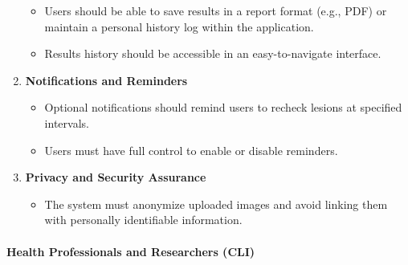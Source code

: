 \documentclass[
  12pt,
  oneside]{article}
\providecommand{\tightlist}{%
  \setlength{\itemsep}{0pt}\setlength{\parskip}{0pt}}
\begin{document}
\begin{enumerate}
  \begin{itemize}
  \tightlist
  \item
    Users should be able to save results in a report format (e.g., PDF)
    or maintain a personal history log within the application.\\
  \item
    Results history should be accessible in an easy-to-navigate
    interface.
  \end{itemize}
\item
  \textbf{Notifications and Reminders}

  \begin{itemize}
  \tightlist
  \item
    Optional notifications should remind users to recheck lesions at
    specified intervals.\\
  \item
    Users must have full control to enable or disable reminders.
  \end{itemize}
\item
  \textbf{Privacy and Security Assurance}

  \begin{itemize}
  \tightlist
  \item
    The system must anonymize uploaded images and avoid linking them
    with personally identifiable information.
  \end{itemize}
\end{enumerate}

\paragraph{Health Professionals and Researchers
(CLI)}\label{health-professionals-and-researchers-cli}
\end{document}
